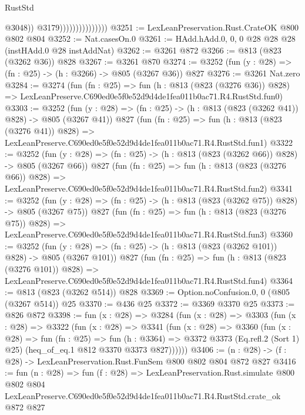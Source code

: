 \begin{lexlean}{RustStd}
\begin{coremodule}
                                      @3048))
                                  @3179)))))))))))))))
@3251 := LexLeanPreservation.Rust.CrateOK @800 @802 @804
@3252 := Nat.casesOn.{0}
@3261 := HAdd.hAdd.{0, 0, 0} @28 @28 @28 (instHAdd.{0} @28 instAddNat)
@3262 := @3261 @872
@3266 := @813 (@823 (@3262 @36)) @828
@3267 := @3261 @870
@3274 := @3252 (fun (y : @28) => (fn : @25) -> (h : @3266) -> @805 (@3267 @36)) @827
@3276 := @3261 Nat.zero
@3284 := @3274
    (fun (fn : @25) =>
    fun (h : @813 (@823 (@3276 @36)) @828) =>
    LexLeanPreserve.C690ed0e5f0e52d9d4de1fea011b0ac71.R4.RustStd.fun0)
@3303 := @3252
    (fun (y : @28) => (fn : @25) -> (h : @813 (@823 (@3262 @41)) @828) -> @805 (@3267 @41))
    @827
    (fun (fn : @25) =>
    fun (h : @813 (@823 (@3276 @41)) @828) =>
    LexLeanPreserve.C690ed0e5f0e52d9d4de1fea011b0ac71.R4.RustStd.fun1)
@3322 := @3252
    (fun (y : @28) => (fn : @25) -> (h : @813 (@823 (@3262 @66)) @828) -> @805 (@3267 @66))
    @827
    (fun (fn : @25) =>
    fun (h : @813 (@823 (@3276 @66)) @828) =>
    LexLeanPreserve.C690ed0e5f0e52d9d4de1fea011b0ac71.R4.RustStd.fun2)
@3341 := @3252
    (fun (y : @28) => (fn : @25) -> (h : @813 (@823 (@3262 @75)) @828) -> @805 (@3267 @75))
    @827
    (fun (fn : @25) =>
    fun (h : @813 (@823 (@3276 @75)) @828) =>
    LexLeanPreserve.C690ed0e5f0e52d9d4de1fea011b0ac71.R4.RustStd.fun3)
@3360 := @3252
    (fun (y : @28) => (fn : @25) -> (h : @813 (@823 (@3262 @101)) @828) -> @805 (@3267 @101))
    @827
    (fun (fn : @25) =>
    fun (h : @813 (@823 (@3276 @101)) @828) =>
    LexLeanPreserve.C690ed0e5f0e52d9d4de1fea011b0ac71.R4.RustStd.fun4)
@3364 := @813 (@823 (@3262 @514)) @828
@3369 := Option.noConfusion.{0, 0} (@805 (@3267 @514)) @25
@3370 := @436 @25
@3372 := @3369 @3370 @25
@3373 := @826 @872
@3398 := fun (x : @28) =>
  @3284
    (fun (x : @28) =>
    @3303
      (fun (x : @28) =>
      @3322
        (fun (x : @28) =>
        @3341
          (fun (x : @28) =>
          @3360
            (fun (x : @28) =>
            fun (fn : @25) =>
            fun (h : @3364) =>
            @3372 @3373 (Eq.refl.{2} (Sort 1) @25) (heq_of_eq.{1} @812 @3370 @3373 @827))))))
@3406 := (n : @28) -> (f : @28) -> LexLeanPreservation.Rust.FunSem @800 @802 @804 @872 @827
@3416 := fun (n : @28) =>
  fun (f : @28) =>
  LexLeanPreservation.Rust.simulate
    @800
    @802
    @804
    LexLeanPreserve.C690ed0e5f0e52d9d4de1fea011b0ac71.R4.RustStd.crate_ok
    @872
    @827
\end{coremodule}
\end{lexlean}

